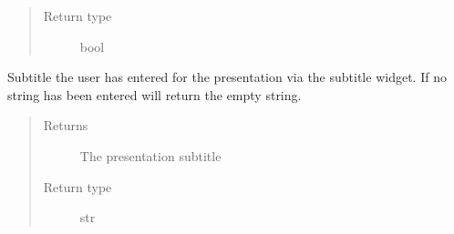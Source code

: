 \documentclass[letterpaper,10pt,english]{sphinxmanual}
\begin{document}
\begin{fulllineitems}
\begin{fulllineitems}
\begin{quote}
\begin{description}
\item[{Return type}] \leavevmode
bool

\end{description}\end{quote}

\end{fulllineitems}


\begin{fulllineitems}
\label{\detokenize{polo.windows:polo.windows.pptx_dialog.PptxDesignerDialog.set_default_titles}}
\end{fulllineitems}


\begin{fulllineitems}
\label{\detokenize{polo.windows:polo.windows.pptx_dialog.PptxDesignerDialog.setup_run_tree}}
\end{fulllineitems}


\begin{fulllineitems}
\label{\detokenize{polo.windows:polo.windows.pptx_dialog.PptxDesignerDialog.subtitle}}
Subtitle the user has entered for the presentation via the subtitle
 widget. If no string has been entered will return the empty
string.
\begin{quote}\begin{description}
\item[{Returns}] \leavevmode
The presentation subtitle

\item[{Return type}] \leavevmode
str

\end{description}\end{quote}


\end{fulllineitems}
\end{fulllineitems}
\end{document}
